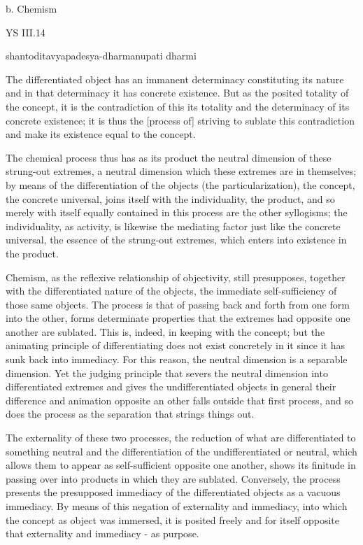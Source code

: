 b. Chemism

YS III.14

shantoditavyapadesya-dharmanupati dharmi

The differentiated object has an immanent determinacy constituting
its nature and in that determinacy it has concrete existence.
But as the posited totality of the concept, it is the contradiction of
this its totality and the determinacy of its concrete existence;
it is thus the [process of] striving to sublate this contradiction
and make its existence equal to the concept.

The chemical process thus has as its product the neutral dimension of
these strung-out extremes, a neutral dimension which these extremes are
in themselves; by means of the differentiation of the objects (the particularization),
the concept, the concrete universal, joins itself
with the individuality, the product, and so merely
with itself equally contained in this process are the other syllogisms;
the individuality, as activity, is likewise the mediating factor just like the concrete universal,
the essence of the strung-out extremes, which enters into existence in the product.

Chemism, as the reflexive relationship of objectivity, still presupposes,
together with the differentiated nature of the objects,
the immediate self-sufficiency of those same objects.
The process is that of passing back and forth from one form into the other,
forms determinate properties that the extremes had opposite one another are sublated.
This is, indeed, in keeping with the concept;
but the animating principle of differentiating does not exist
concretely in it since it has sunk back into immediacy.
For this reason, the neutral dimension is a separable dimension.
Yet the judging principle that severs the neutral dimension into
differentiated extremes and gives the undifferentiated objects in general
their difference and animation opposite an other falls outside that first process,
and so does the process as the separation that strings things out.

The externality of these two processes,
the reduction of what are differentiated to something neutral and
the differentiation of the undifferentiated or neutral,
which allows them to appear as self-sufficient opposite one another,
shows its finitude in passing over into products in which they are sublated.
Conversely, the process presents the presupposed immediacy
of the differentiated objects as a vacuous immediacy.
By means of this negation of externality and immediacy,
into which the concept as object was immersed,
it is posited freely and for itself opposite
that externality and immediacy - as purpose.

